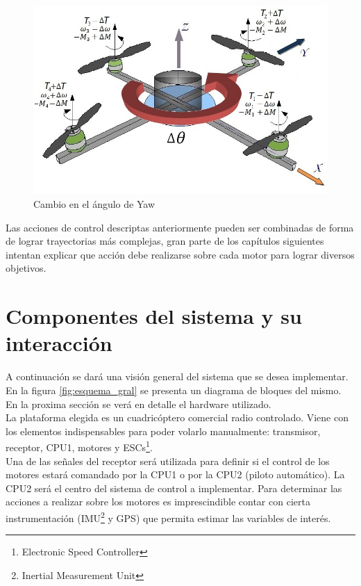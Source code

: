 \documentclass[main]{subfiles}
\begin{document}
\begin{figure}[!h]
\centering
\includegraphics[scale=0.4]{./pics_general/quad_theta.jpg}
\caption{Cambio en el \'angulo de Yaw}
\label{fig:quad_theta}
\end{figure}
Las acciones de control descriptas anteriormente pueden ser combinadas de forma de lograr trayectorias m\'as complejas, gran parte de los cap\'itulos siguientes intentan explicar que acci\'on debe realizarse sobre cada motor para lograr diversos objetivos.

\section{Componentes del sistema y su interacci\'on}

A continuaci\'on se dar\'a una visi\'on general del sistema que se desea implementar. En la figura \ref{fig:esquema_gral} se presenta un diagrama de bloques del mismo. En la proxima secci\'on se ver\'a en detalle el hardware utilizado.\\

La plataforma elegida es un cuadric\'optero comercial radio controlado. Viene con los elementos indispensables para poder volarlo manualmente: transmisor, receptor, CPU1, motores y ESCs\footnote{Electronic Speed Controller}.\\   

Una de las señales del receptor ser\'a utilizada para definir si el control de los motores estar\'a comandado por la CPU1 o por la CPU2 (piloto autom\'atico). La CPU2 ser\'a el centro del sistema de control a implementar. Para determinar las acciones a realizar sobre los motores es imprescindible contar con cierta instrumentaci\'on (IMU\footnote{Inertial Measurement Unit} y GPS) que permita estimar las variables de inter\'es.\\
\end{document}

